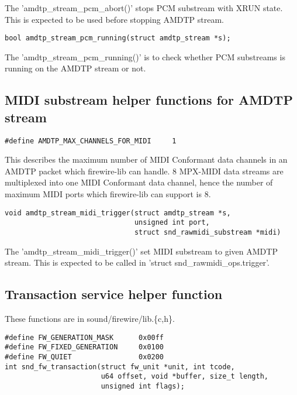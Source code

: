 \documentclass[onecolumn]{article}
\begin{document}
The 'amdtp\_stream\_pcm\_abort()' stops PCM substream with XRUN state. This is expected to be used before stopping AMDTP stream.

\begin{verbatim}
bool amdtp_stream_pcm_running(struct amdtp_stream *s);
\end{verbatim}

The 'amdtp\_stream\_pcm\_running()' is to check whether PCM substreams is running on the AMDTP stream or not.


\subsection{MIDI substream helper functions for AMDTP stream}

\begin{verbatim}
#define AMDTP_MAX_CHANNELS_FOR_MIDI     1
\end{verbatim}

This describes the maximum number of MIDI Conformant data channels in an AMDTP packet which firewire-lib can handle. 8 MPX-MIDI data streams are multiplexed into one MIDI Conformant data channel\cite{amei-rp27, iec61883-6-2}, hence the number of maximum MIDI ports which firewire-lib can support is 8.

\begin{verbatim}
void amdtp_stream_midi_trigger(struct amdtp_stream *s,
                               unsigned int port,
                               struct snd_rawmidi_substream *midi)
\end{verbatim}

The 'amdtp\_stream\_midi\_trigger()' set MIDI substream to given AMDTP stream. This is expected to be called in 'struct snd\_rawmidi\_ops.trigger'.


\subsection{Transaction service helper function}

These functions are in sound/firewire/lib.\{c,h\}.

\begin{verbatim}
#define FW_GENERATION_MASK      0x00ff
#define FW_FIXED_GENERATION     0x0100
#define FW_QUIET                0x0200
int snd_fw_transaction(struct fw_unit *unit, int tcode,
                       u64 offset, void *buffer, size_t length,
                       unsigned int flags);
\end{verbatim}
\end{document}
